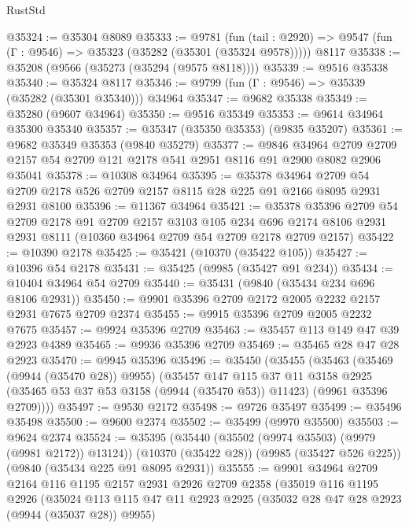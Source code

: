 \begin{lexlean}{RustStd}
\begin{coremodule}
@35324 := @35304 @8089
@35333 := @9781
    (fun (tail : @2920) => @9547 (fun (Γ : @9546) => @35323 (@35282 (@35301 (@35324 @9578)))))
    @8117
@35338 := @35208 (@9566 (@35273 (@35294 (@9575 @8118))))
@35339 := @9516 @35338
@35340 := @35324 @8117
@35346 := @9799 (fun (Γ : @9546) => @35339 (@35282 (@35301 @35340))) @34964
@35347 := @9682 @35338
@35349 := @35280 (@9607 @34964)
@35350 := @9516 @35349
@35353 := @9614 @34964 @35300 @35340
@35357 := @35347 (@35350 @35353) (@9835 @35207)
@35361 := @9682 @35349 @35353 (@9840 @35279)
@35377 := @9846
    @34964
    @2709
    @2709
    @2157
    @54
    @2709
    @121
    @2178
    @541
    @2951
    @8116
    @91
    @2900
    @8082
    @2906
    @35041
@35378 := @10308 @34964
@35395 := @35378
    @34964
    @2709
    @54
    @2709
    @2178
    @526
    @2709
    @2157
    @8115
    @28
    @225
    @91
    @2166
    @8095
    @2931
    @2931
    @8100
@35396 := @11367 @34964
@35421 := @35378
    @35396
    @2709
    @54
    @2709
    @2178
    @91
    @2709
    @2157
    @3103
    @105
    @234
    @696
    @2174
    @8106
    @2931
    @2931
    @8111
    (@10360 @34964 @2709 @54 @2709 @2178 @2709 @2157)
@35422 := @10390 @2178
@35425 := @35421 (@10370 (@35422 @105))
@35427 := @10396 @54 @2178
@35431 := @35425 (@9985 (@35427 @91 @234))
@35434 := @10404 @34964 @54 @2709
@35440 := @35431 (@9840 (@35434 @234 @696 @8106 @2931))
@35450 := @9901 @35396 @2709 @2172 @2005 @2232 @2157 @2931 @7675 @2709 @2374
@35455 := @9915 @35396 @2709 @2005 @2232 @7675
@35457 := @9924 @35396 @2709
@35463 := @35457 @113 @149 @47 @39 @2923 @4389
@35465 := @9936 @35396 @2709
@35469 := @35465 @28 @47 @28 @2923
@35470 := @9945 @35396
@35496 := @35450
    (@35455
      (@35463
        (@35469 (@9944 (@35470 @28)) @9955)
        (@35457
          @147
          @115
          @37
          @11
          @3158
          @2925
          (@35465 @53 @37 @53 @3158 (@9944 (@35470 @53)) @11423)
          (@9961 @35396 @2709))))
@35497 := @9530 @2172
@35498 := @9726 @35497
@35499 := @35496 @35498
@35500 := @9600 @2374
@35502 := @35499 (@9970 @35500)
@35503 := @9624 @2374
@35524 := @35395
    (@35440 (@35502 (@9974 @35503) (@9979 (@9981 @2172)) @13124))
    (@10370 (@35422 @28))
    (@9985 (@35427 @526 @225))
    (@9840 (@35434 @225 @91 @8095 @2931))
@35555 := @9901
    @34964
    @2709
    @2164
    @116
    @1195
    @2157
    @2931
    @2926
    @2709
    @2358
    (@35019
      @116
      @1195
      @2926
      (@35024
        @113
        @115
        @47
        @11
        @2923
        @2925
        (@35032 @28 @47 @28 @2923 (@9944 (@35037 @28)) @9955)

\end{coremodule}
\end{lexlean}
